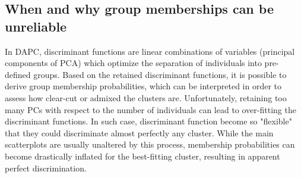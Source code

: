 \documentclass{article}
\begin{document}
\subsection{When and why group memberships can be unreliable}

In DAPC, discriminant functions are linear combinations of variables (principal components of PCA) which
optimize the separation of individuals into pre-defined groups. Based on the retained discriminant
functions, it is possible to derive group membership probabilities, which can be interpreted in
order to assess how clear-cut or admixed the clusters are.
Unfortunately, retaining too many PCs with respect to the number of individuals can lead to over-fitting the discriminant functions.
In such case, discriminant function become so "flexible" that they could discriminate almost perfectly any cluster.
While the main scatterplots are usually unaltered by this process, membership probabilities can
become drastically inflated for the best-fitting cluster, resulting in apparent perfect discrimination.
\\
\end{document}
